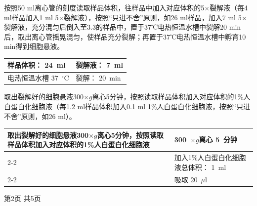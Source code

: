 \documentclass[UTF8,10pt,a4paper,fontset=fandol]{ctexart}
\newcommand{\fieldvalue}[1]{#1}
\newcommand{\handwritten}[1]{#1}
\begin{document}
\noindent
按照50 ml离心管的刻度读取样品体积，往样品中加入对应体积的5$\times$裂解液（每4 ml样品加入1 ml 5$\times$裂解液），按照“只进不舍”原则，如26 ml样品，加入7 ml 5$\times$裂解液，充分混匀后倒入至3.3的样品中，置于37℃电热恒温水槽中裂解20 min后，取出离心管摇晃混匀，使样品充分裂解；再置于37℃电热恒温水槽中孵育10 min得到细胞悬液。

\begin{center}
\begin{tabular}{|p{8.0cm}|p{5.3cm}|}
\hline
样品体积：
\fieldvalue{\handwritten{24}}\ ml &
裂解液：
\fieldvalue{\handwritten{7}}\ ml\\
\hline
电热恒温水槽
\fieldvalue{\handwritten{37}}~$^\circ$C &
裂解：
\fieldvalue{\handwritten{20}}\ min\\
\hline
\end{tabular}
\end{center}

\noindent
取出裂解好的细胞悬液300$\times g$离心5分钟，按照读取样品体积加入对应体积的1\%人白蛋白化细胞液（每1.2 ml样品体积加入0.1 ml 1\%人白蛋白化细胞液，按照“只进不舍”原则，如26 ml）。

\begin{center}
\begin{tabular}{|p{8.0cm}|p{5.3cm}|}
\hline
取出裂解好的细胞悬液300$\times g$离心5分钟，按照读取样品体积加入对应体积的1\%人白蛋白化细胞液 &
\fieldvalue{\handwritten{300}}\ $\times g$离心
\fieldvalue{\handwritten{5}}\ 分钟\\
\cline{2-2}
&
加入1\%人白蛋白化细胞液总体积：
\fieldvalue{\handwritten{1}}\ ml\\
\cline{2-2}
&
吸取
\fieldvalue{\handwritten{20}}\ $\mu$l\\
\hline
\end{tabular}
\end{center}

\begin{center}
第2页 共5页
\end{center}
\end{document}
